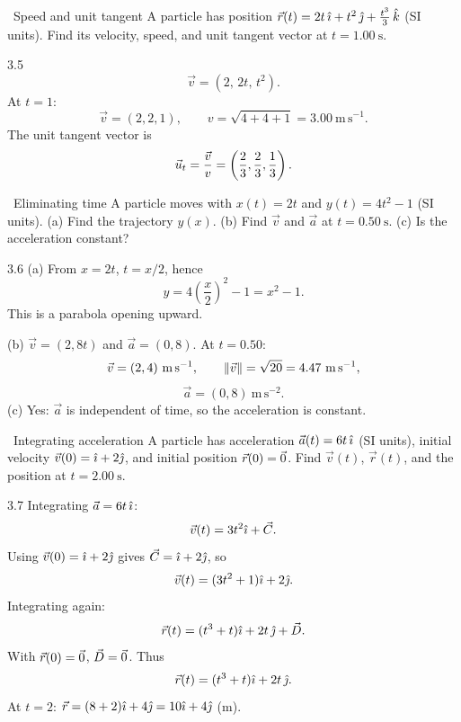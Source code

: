 \begin{exercise}{\core\ Speed and unit tangent}
A particle has position
$\vec r(t)=2t\,\hat{\imath}+t^2\,\hat{\jmath}+\frac{t^3}{3}\,\hat{k}$ (SI units).
Find its velocity, speed, and unit tangent vector at $t=1.00\ \mathrm{s}$.
\end{exercise}

\begin{tabletworkspace}[6.5cm]
\end{tabletworkspace}

\begin{solution}{3.5}
\[
\vec v=(2,\,2t,\,t^2).
\]
At $t=1$:
\[
\vec v=(2,2,1),\qquad v=\sqrt{4+4+1}=3.00\ \mathrm{m\,s^{-1}}.
\]
The unit tangent vector is
\[
\vec{u}_t=\frac{\vec v}{v}=\left(\frac23,\frac23,\frac13\right).
\]
\end{solution}

\begin{exercise}{\core\ Eliminating time}
A particle moves with $x(t)=2t$ and $y(t)=4t^2-1$ (SI units).
(a) Find the trajectory $y(x)$.
(b) Find $\vec v$ and $\vec a$ at $t=0.50\ \mathrm{s}$.
(c) Is the acceleration constant?
\end{exercise}

\begin{tabletworkspace}[6.5cm]
\end{tabletworkspace}

\begin{solution}{3.6}
(a) From $x=2t$, $t=x/2$, hence
\[
y=4\left(\frac x2\right)^2-1=x^2-1.
\]
This is a parabola opening upward.

(b) $\vec v=(2,8t)$ and $\vec a=(0,8)$. At $t=0.50$:
\[
\vec v=(2,4)\ \mathrm{m\,s^{-1}},\qquad
\left\lVert \vec v \right\rVert=\sqrt{20}=4.47\ \mathrm{m\,s^{-1}},
\]
\[
\vec a=(0,8)\ \mathrm{m\,s^{-2}}.
\]
(c) Yes: $\vec a$ is independent of time, so the acceleration is constant.
\end{solution}

\begin{exercise}{\core\ Integrating acceleration}
A particle has acceleration $\vec a(t)=6t\,\hat{\imath}$ (SI units), initial velocity
$\vec v(0)=\hat{\imath}+2\hat{\jmath}$, and initial position $\vec r(0)=\vec{0}$.
Find $\vec v(t)$, $\vec r(t)$, and the position at $t=2.00\ \mathrm{s}$.
\end{exercise}

\begin{tabletworkspace}[6.5cm]
\end{tabletworkspace}

\begin{solution}{3.7}
Integrating $\vec a=6t\,\hat{\imath}$:
\[
\vec v(t)=3t^2\hat{\imath}+\vec C.
\]
Using $\vec v(0)=\hat{\imath}+2\hat{\jmath}$ gives $\vec C=\hat{\imath}+2\hat{\jmath}$, so
\[
\vec v(t)=(3t^2+1)\hat{\imath}+2\hat{\jmath}.
\]
Integrating again:
\[
\vec r(t)=(t^3+t)\hat{\imath}+2t\,\hat{\jmath}+\vec D.
\]
With $\vec r(0)=\vec{0}$, $\vec D=\vec{0}$. Thus
\[
\vec r(t)=(t^3+t)\hat{\imath}+2t\,\hat{\jmath}.
\]
At $t=2$: $\vec r=(8+2)\hat{\imath}+4\hat{\jmath}=10\hat{\imath}+4\hat{\jmath}$ (m).
\end{solution}

